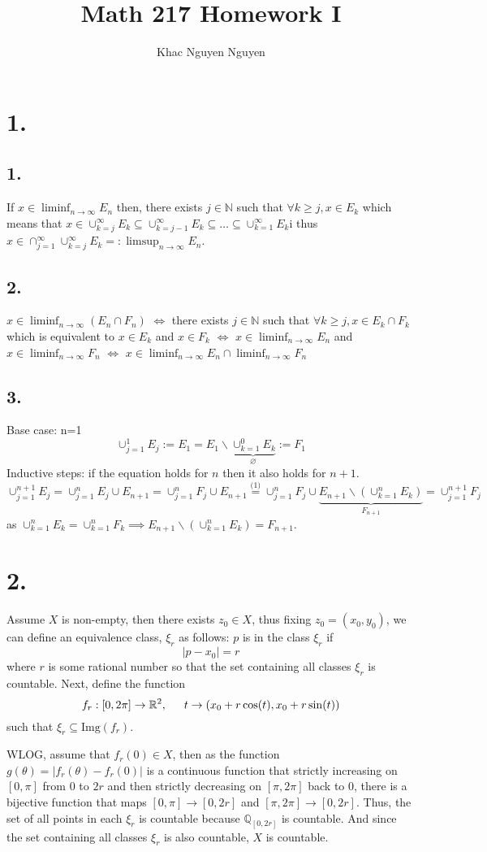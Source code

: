 \documentclass[11pt]{article}
\title{\textbf{Math 217 Homework I}}
\author{Khac Nguyen Nguyen}
\date{}
\theoremstyle{mystyle}
\theoremstyle{definition}
\begin{document}
\section*{1.}
\subsection*{1.}
If $x \in \liminf_{n\to \infty} E_n$ then, there exists $j \in \mathbb{N}$ such that $\forall k \ge j, x \in E_k$ which means that $x \in \cup_{k=j}^\infty E_k \subseteq \cup_{k=j-1}^\infty E_k \subseteq \hdots \subseteq \cup_{k=1}^\infty E_k$i thus $x \in \cap_{j=1}^\infty \cup_{k=j}^\infty E_k =: \limsup_{n \to \infty} E_n$.
\subsection*{2.}
$x \in \liminf_{n \to \infty}(E_n \cap F_n)$ 
$\iff$ there exists $j \in \mathbb{N}$ such that $\forall k \ge j, x \in E_k \cap F_k$ which is equivalent to $x \in E_k$ and $x \in F_k$ 
$\iff$ $x \in \liminf_{n\to \infty} E_n$ and $x \in \liminf_{n \to \infty} F_n$ 
$\iff$ $x \in \liminf_{n\to \infty} E_n \cap \liminf_{n \to \infty} F_n$ 
\subsection*{3.}
Base case: n=1
\[
  \cup_{j=1}^1 E_j := E_1 = E_1 \backslash \underbrace{\cup_{k=1}^0 E_k}_{\varnothing} := F_1 
\]
Inductive steps: if the equation holds for $n$ then it also holds for $n+1$.
\[
  \cup_{j=1}^{n+1} E_j = \cup_{j=1}^n E_j \cup E_{n+1} = \cup_{j=1}^n F_j \cup E_{n+1} \stackrel{\text{(1)}}{=} \cup_{j=1}^n F_j \cup \underbrace{E_{n+1} \backslash (\cup_{k=1}^n E_k)}_{F_{n+1}} = \cup_{j=1}^{n+1} F_j  
\]
as $\cup_{k=1}^n E_k = \cup_{k=1}^n F_k \implies E_{n+1} \backslash (\cup_{k=1}^n E_k) = F_{n+1}$.
\newpage
\section*{2.}
Assume $X$ is non-empty, then there exists $z_0 \in X$, thus fixing $z_0 = (x_0,y_0)$, we can define an equivalence class, $\xi_r$ as follows: 
$p$ is in the class $\xi_r$ if 
\[
  |p-x_0| = r
\]
where $r$ is some rational number so that the set containing all classes $\xi_r$ is countable. Next, define the function 
\[
  f_r: [0, 2\pi] \to \mathbb{R}^2, \indent t \to (x_0 + r\cos(t), x_0 + r\sin(t))
\]
such that $\xi_r \subseteq \text{Img}(f_r)$. 

WLOG, assume that $f_r(0) \in X$, then 
as the function \\ 
$g(\theta) =  |f_r(\theta) - f_r(0)|$ is a continuous function that strictly increasing on $[0, \pi]$ from $0$ to $2r$ and then strictly decreasing on $[\pi,2\pi]$ back to 0, there is a bijective function that maps $[0,\pi] \to [0, 2r]$ and $[\pi, 2\pi] \to [0,2r]$. Thus, the set of all points in each $\xi_r$ is countable because $\mathbb{Q}_{[0,2r]}$ is countable. And since the set containing all classes $\xi_r$ is also countable, $X$ is countable.
\newpage
\end{document}
